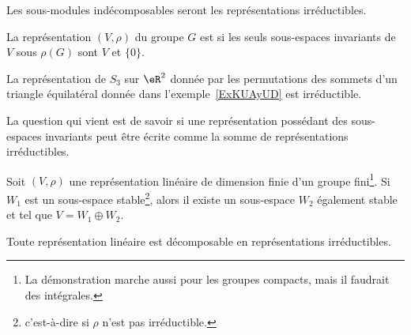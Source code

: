 Les sous-modules indécomposables seront les représentations irréductibles.

\begin{definition}
	La représentation \( (V,\rho)\) du groupe \( G\) est  si les seuls sous-espaces invariants de \( V\) sous \( \rho(G)\) sont \( V\) et \( \{ 0 \}\).
\end{definition}

\begin{example}
	La représentation de \( S_3\) sur \( \eR^2\) donnée par les permutations des sommets d'un triangle équilatéral donnée dans l'exemple~\ref{ExKUAyUD} est irréductible.
\end{example}

La question qui vient est de savoir si une représentation possédant des sous-espaces invariants peut être écrite comme la somme de représentations irréductibles.

\begin{proposition} \label{PropHeyoAN}  
	Soit \( (V,\rho)\) une représentation linéaire de dimension finie d'un groupe fini\footnote{La démonstration marche aussi pour les groupes compacts, mais il faudrait des intégrales.}. Si \( W_1\) est un sous-espace stable\footnote{c'est-à-dire si \( \rho\) n'est pas irréductible.}, alors il existe un sous-espace \( W_2\) également stable et tel que \( V=W_1\oplus W_2\).

	Toute représentation linéaire est décomposable en représentations irréductibles.
\end{proposition}

